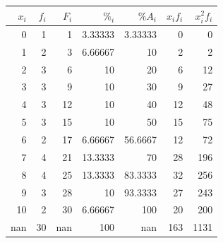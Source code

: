 \documentclass[spanish, 11pt]{exam}
\begin{document}
\begin{questions}
\begin{parts}
\begin{solution}
\begin{tabular}{rrrrrrr}
\hline
   $x_i$ &   $f_i$ &   $F_i$ &      $\%_i$ &     $\%A_i$ &   $x_if_i$ &   $x^2_if_i$ \\
\hline
       0 &       1 &       1 &   3.33333 &   3.33333 &          0 &            0 \\
       1 &       2 &       3 &   6.66667 &  10       &          2 &            2 \\
       2 &       3 &       6 &  10       &  20       &          6 &           12 \\
       3 &       3 &       9 &  10       &  30       &          9 &           27 \\
       4 &       3 &      12 &  10       &  40       &         12 &           48 \\
       5 &       3 &      15 &  10       &  50       &         15 &           75 \\
       6 &       2 &      17 &   6.66667 &  56.6667  &         12 &           72 \\
       7 &       4 &      21 &  13.3333  &  70       &         28 &          196 \\
       8 &       4 &      25 &  13.3333  &  83.3333  &         32 &          256 \\
       9 &       3 &      28 &  10       &  93.3333  &         27 &          243 \\
      10 &       2 &      30 &   6.66667 & 100       &         20 &          200 \\
     nan &      30 &     nan & 100       & nan       &        163 &         1131 \\
\hline

\end{tabular}
\end{solution}
\end{parts}
\end{questions}
\end{document}
